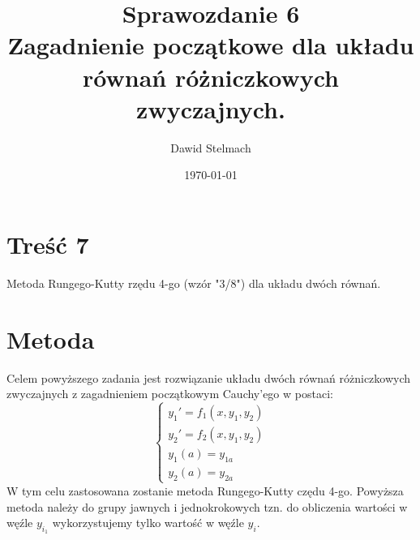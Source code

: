 \documentclass[11pt]{article}
\begin{document}
	
	\title{Sprawozdanie 6 \\ \textbf{Zagadnienie początkowe dla układu równań różniczkowych zwyczajnych.}}
	\author{Dawid Stelmach}
	\date{\today}
	\maketitle\textsl{}
	
	\section{Treść 7}
	Metoda Rungego-Kutty rzędu 4-go (wzór "3/8") dla układu dwóch równań.
	
	\section{Metoda}
	Celem powyższego zadania jest rozwiązanie układu dwóch równań różniczkowych zwyczajnych z zagadnieniem początkowym Cauchy'ego w postaci:
	$$\begin{cases}
	y_1' = f_1(x,y_1,y_2) \\
	y_2' = f_2(x,y_1,y_2) \\
	y_1(a) = y_{1a} \\
	y_2(a) = y_{2a}
	\end{cases}
	$$
	W tym celu zastosowana zostanie metoda Rungego-Kutty czędu 4-go.
	\medskip
	Powyższa metoda należy do grupy jawnych i jednokrokowych tzn. do obliczenia wartości w węźle $y_{i_1}$ wykorzystujemy tylko wartość w węźle $y_i$.
	
\end{document}
